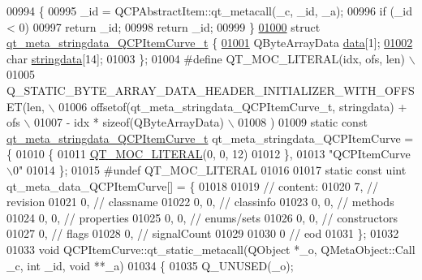 \begin{DoxyCode}
00994 \{
00995     \_id = QCPAbstractItem::qt\_metacall(\_c, \_id, \_a);
00996     \textcolor{keywordflow}{if} (\_id < 0)
00997         \textcolor{keywordflow}{return} \_id;
00998     \textcolor{keywordflow}{return} \_id;
00999 \}
\hypertarget{a00016_source_l01000}{}\hyperlink{a00016}{01000} \textcolor{keyword}{struct }\hyperlink{a00016_d7/d70/a00106}{qt\_meta\_stringdata\_QCPItemCurve\_t} \{
\hypertarget{a00016_source_l01001}{}\hyperlink{a00016_a0424f9a0b87bc8cefa2966874c4c5667}{01001}     QByteArrayData \hyperlink{a00016_a0424f9a0b87bc8cefa2966874c4c5667}{data}[1];
\hypertarget{a00016_source_l01002}{}\hyperlink{a00016_af1db92bb182f435f88c938cc13a52a2c}{01002}     \textcolor{keywordtype}{char} \hyperlink{a00016_af1db92bb182f435f88c938cc13a52a2c}{stringdata}[14];
01003 \};
01004 \textcolor{preprocessor}{#define QT\_MOC\_LITERAL(idx, ofs, len) \(\backslash\)}
01005 \textcolor{preprocessor}{    Q\_STATIC\_BYTE\_ARRAY\_DATA\_HEADER\_INITIALIZER\_WITH\_OFFSET(len, \(\backslash\)}
01006 \textcolor{preprocessor}{    offsetof(qt\_meta\_stringdata\_QCPItemCurve\_t, stringdata) + ofs \(\backslash\)}
01007 \textcolor{preprocessor}{        - idx * sizeof(QByteArrayData) \(\backslash\)}
01008 \textcolor{preprocessor}{    )}
01009 \textcolor{keyword}{static} \textcolor{keyword}{const} \hyperlink{a00016_d7/d70/a00106}{qt\_meta\_stringdata\_QCPItemCurve\_t} 
      qt\_meta\_stringdata\_QCPItemCurve = \{
01010     \{
01011 \hyperlink{a00016_a75bb9482d242cde0a06c9dbdc6b83abe}{QT\_MOC\_LITERAL}(0, 0, 12)
01012     \},
01013     \textcolor{stringliteral}{"QCPItemCurve\(\backslash\)0"}
01014 \};
01015 \textcolor{preprocessor}{#undef QT\_MOC\_LITERAL}
01016 
01017 \textcolor{keyword}{static} \textcolor{keyword}{const} uint qt\_meta\_data\_QCPItemCurve[] = \{
01018 
01019  \textcolor{comment}{// content:}
01020        7,       \textcolor{comment}{// revision}
01021        0,       \textcolor{comment}{// classname}
01022        0,    0, \textcolor{comment}{// classinfo}
01023        0,    0, \textcolor{comment}{// methods}
01024        0,    0, \textcolor{comment}{// properties}
01025        0,    0, \textcolor{comment}{// enums/sets}
01026        0,    0, \textcolor{comment}{// constructors}
01027        0,       \textcolor{comment}{// flags}
01028        0,       \textcolor{comment}{// signalCount}
01029 
01030        0        \textcolor{comment}{// eod}
01031 \};
01032 
01033 \textcolor{keywordtype}{void} QCPItemCurve::qt\_static\_metacall(QObject *\_o, QMetaObject::Call \_c, \textcolor{keywordtype}{int} \_id, \textcolor{keywordtype}{void} **\_a)
01034 \{
01035     Q\_UNUSED(\_o);

\end{DoxyCode}
